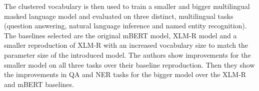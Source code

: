 The clustered vocabulary is then used to train a smaller and bigger multilingual masked language model and evaluated on three distinct, multilingual tasks (question answering, natural language inference and named entity recognition). The baselines selected are the original mBERT model, XLM-R model and a smaller reproduction of XLM-R with an increased vocabulary size to match the parameter size of the introduced model. The authors show improvements for the smaller model on all three tasks over their baseline reproduction. Then they show the improvements in QA and NER tasks for the bigger model over the XLM-R and mBERT baselines. 


